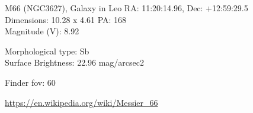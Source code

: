 \begin{block}{M66 (NGC3627), Galaxy in Leo}
    RA: 11:20:14.96, Dec: +12:59:29.5 \\ 
    Dimensions: 10.28 x 4.61 PA: 168 \\ 
    Magnitude (V): 8.92

    Morphological type: Sb \\ 
    Surface Brightness: 22.96 mag/arcsec2 


    Finder fov: 60 

    \url{https://en.wikipedia.org/wiki/Messier_66} 
\end{block}